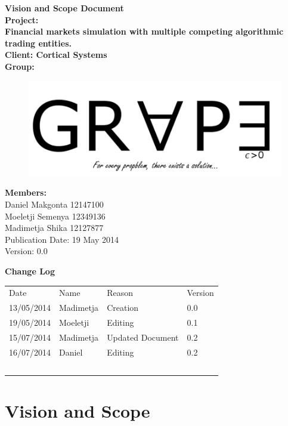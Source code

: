 \documentclass[12pt]{article}
\newcommand{\Title}{Vision and Scope Document} %
\begin{document}
	\begin{center}%
		\LARGE \bf \Title \\[2em]
		\Large {Project:}\\
		Financial markets simulation with multiple competing algorithmic trading entities.\\[0.7em]
		\Large {Client:}
		Cortical Systems\\[2em]
		\LARGE {\bf Group:}\\
			\begin{figure}[ht!]
				\centering
				\includegraphics[scale=0.4]{Logo8.png}
			\end{figure}
			
		\Large {\bf Members:}\\[0.3em]
		\large
		Daniel Makgonta 12147100\\
		Moeletji Semenya 12349136\\
		Madimetja Shika 12127877\\[3em]
	
	\small Publication Date: 19 May 2014\\[0.5em]
	\small Version: 0.0 		    
	\end{center}%
	
	\newpage		
	\LARGE 
 	{\bf Change Log}\\[1em]
	\begin{tabular}{llll}
		Date & Name & Reason & Version \\
		13/05/2014 & Madimetja & Creation & 0.0 \\
		19/05/2014 & Moeletji & Editing & 0.1 \\
		15/07/2014 & Madimetja & Updated Document & 0.2 \\
		16/07/2014 & Daniel & Editing & 0.2 \\
		~ & ~ & ~ & ~ \\
	\end{tabular}
	

	
	\newpage
	\tableofcontents
				  
	\newpage
	\section{Vision and Scope}
\end{document}
